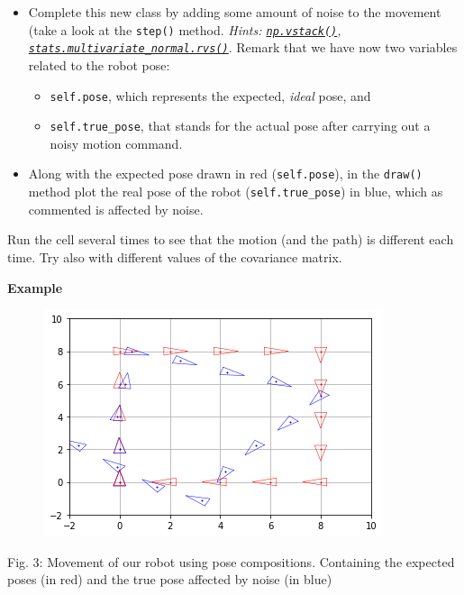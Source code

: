 \documentclass[11pt]{article}
\providecommand{\tightlist}{%
      \setlength{\itemsep}{0pt}\setlength{\parskip}{0pt}}
\begin{document}
\begin{itemize}
\tightlist
\item
  Complete this new class by adding some amount of noise to the movement
  (take a look at the \texttt{step()} method. \emph{Hints:
  \href{https://docs.scipy.org/doc/numpy/reference/generated/numpy.vstack.html}{\texttt{np.vstack()}},
  \href{https://docs.scipy.org/doc/scipy/reference/generated/scipy.stats.multivariate_normal.html}{\texttt{stats.multivariate\_normal.rvs()}}}.
  Remark that we have now two variables related to the robot pose:

  \begin{itemize}
  \tightlist
  \item
    \texttt{self.pose}, which represents the expected, \emph{ideal}
    pose, and
  \item
    \texttt{self.true\_pose}, that stands for the actual pose after
    carrying out a noisy motion command.
  \end{itemize}
\item
  Along with the expected pose drawn in red (\texttt{self.pose}), in the
  \texttt{draw()} method plot the real pose of the robot
  (\texttt{self.true\_pose}) in blue, which as commented is affected by
  noise.
\end{itemize}

Run the cell several times to see that the motion (and the path) is
different each time. Try also with different values of the covariance
matrix.

\textbf{Example}

\begin{figure}
\centering
\includegraphics{images/fig3-1-2.png}
\end{figure}
Fig. 3: Movement of our robot using pose compositions. Containing the
expected poses (in red) and the true pose affected by noise (in blue)
\end{document}
